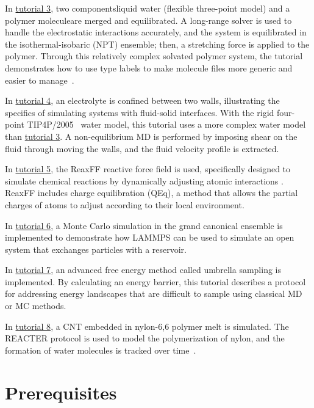 \documentclass[9pt,tutorial]{livecoms}
\begin{document}
In \hyperref[all-atom-label]{tutorial 3}, two components\textemdash liquid water
(flexible three-point model) and a polymer molecule\textemdash are merged and
equilibrated.  A long-range solver is used to handle the electrostatic
interactions accurately, and the system is equilibrated in the
isothermal-isobaric (NPT) ensemble; then, a stretching force is applied
to the polymer.  Through this relatively complex solvated polymer
system, the tutorial demonstrates how to use type labels to make
molecule files more generic and easier to manage~\cite{typelabel_paper}.

In \hyperref[sheared-confined-label]{tutorial 4}, an electrolyte is
confined between two walls, illustrating the specifics of simulating
systems with fluid-solid interfaces.  With the rigid four-point
TIP4P/2005~\cite{abascal2005general} water model, this tutorial uses a
more complex water model than \hyperref[all-atom-label]{tutorial 3}.  A
non-equilibrium MD is performed by imposing shear on the fluid through
moving the walls, and the fluid velocity profile is extracted.

In \hyperref[reactive-silicon-dioxide-label]{tutorial 5}, the ReaxFF
reactive force field is used, specifically designed to simulate chemical
reactions by dynamically adjusting atomic interactions
\cite{van2001reaxff}.  ReaxFF includes charge equilibration (QEq), a
method that allows the partial charges of atoms to adjust according to
their local environment.

In \hyperref[gcmc-silica-label]{tutorial 6}, a Monte Carlo simulation in
the grand canonical ensemble is implemented to demonstrate how LAMMPS
can be used to simulate an open system that exchanges particles with a
reservoir.

In \hyperref[umbrella-sampling-label]{tutorial 7}, an advanced free
energy method called umbrella sampling is implemented.  By calculating
an energy barrier, this tutorial describes a protocol
for addressing energy landscapes that are difficult to sample using
classical MD or MC methods.

In \hyperref[bond-react-label]{tutorial 8}, a CNT embedded in
nylon-6,6 polymer melt is simulated.  The
REACTER protocol is used to model the polymerization of nylon, and the formation
of water molecules is tracked over time~\cite{gissinger2020reacter}.

\section{Prerequisites}
\end{document}

